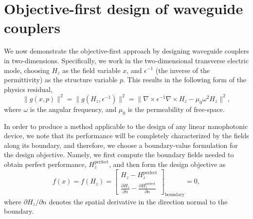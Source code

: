 \documentclass[letterpaper,10pt]{article}
\begin{document}
\section{Objective-first design of waveguide couplers}
We now demonstrate the objective-first approach
    by designing waveguide couplers in two-dimensions.
Specifically, we work in the two-dimensional transverse electric mode,
    choosing $H_z$ as the field variable $x$,
    and $\epsilon^{-1}$ (the inverse of the permittivity) 
    as the structure variable $p$.
This results in the following form of the physics residual,
    \begin{equation}
    \|g(x,p)\|^2 = 
    \|g(H_z, \epsilon^{-1})\|^2 = 
    \| \nabla \times \epsilon^{-1} \nabla \times H_z - \mu_0 \omega^2 H_z \|^2,
    \end{equation}
    where $\omega$ is the angular frequency,
    and $\mu_0$ is the permeability of free-space.

In order to produce a method applicable 
    to the design of any linear nanophotonic device,
    we note that its performance
    will be completely characterized by the fields along its boundary,
    and therefore, 
    we choose a boundary-value formulation for the design objective.
Namely, we first compute the boundary fields needed to obtain
    perfect performance, $H_z^\text{perfect}$,
    and then form the design objective as
    \begin{equation}
    f(x) = f(H_z) = \begin{bmatrix}
        H_z - H_z^\text{perfect} \\
        \frac{\partial H_z}{\partial n} - 
            \frac{\partial H_z^\text{perfect}}{\partial n}
        \end{bmatrix}_\text{boundary}
        = 0,
    \end{equation}
    where $\partial H_z / \partial n$ 
    denotes the spatial derivative in the direction normal to the boundary.
\end{document}
